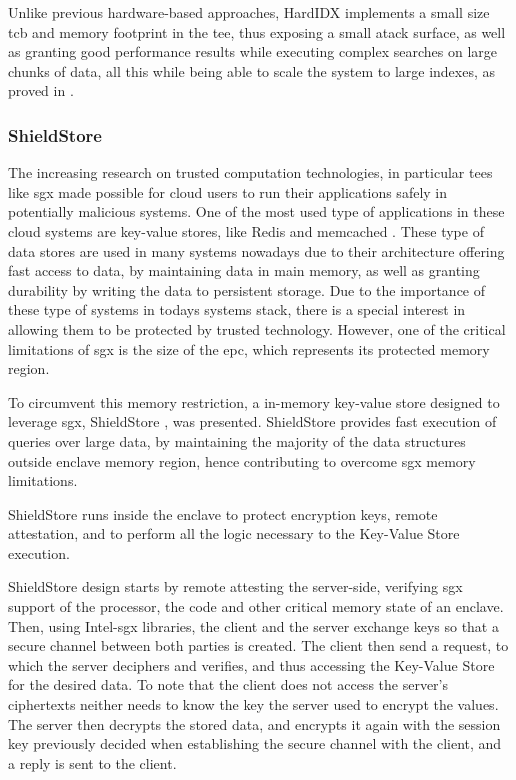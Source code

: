 Unlike previous hardware-based approaches, HardIDX implements a small size \gls{tcb} and memory footprint in the \gls{tee}, thus exposing a small atack surface, as well as granting good performance results while executing complex searches on large chunks of data, all this while being able to scale the system to large indexes, as proved in \cite{hardIDXPaper}. 



\subsubsection{ShieldStore}
The increasing research on trusted computation technologies, in particular \gls{tee}s like \gls{sgx} made possible for cloud users to run their applications safely in potentially malicious systems. One of the most used type of applications in these cloud systems are key-value stores, like Redis \cite{redisWebsite} and memcached \cite{memcachedWebsite}. These type of data stores are used in many systems nowadays due to their architecture offering fast access to data, by maintaining data in main memory, as well as granting durability by writing the data to persistent storage.  Due to the importance of these type of systems in todays systems stack, there is a special interest in allowing them to be protected by trusted technology. However, one of the critical limitations of \gls{sgx} is the size of the \gls{epc}, which represents its protected memory region. 

To circumvent this memory restriction, a in-memory key-value store designed to leverage \gls{sgx}, ShieldStore \cite{shieldStorePaper}, was presented. ShieldStore provides fast execution of queries over large data, by maintaining the majority of the data structures outside enclave memory region, hence contributing to overcome \gls{sgx} memory limitations.

ShieldStore runs inside the enclave to protect encryption keys, remote attestation, and to perform all the logic necessary to the Key-Value Store execution.

ShieldStore design starts by remote attesting the server-side, verifying \gls{sgx} support of the processor, the code and other critical memory state of an enclave. Then, using Intel-\gls{sgx} libraries, the client and the server exchange keys so that a secure channel between both parties is created. The client then send a request, to which the server deciphers and verifies, and thus accessing the Key-Value Store for the desired data. To note that the client does not access the server's ciphertexts neither needs to know the key the server used to encrypt the values. The server then decrypts the stored data, and encrypts it again with the session key previously decided when establishing the secure channel with the client, and a reply is sent to the client.    

